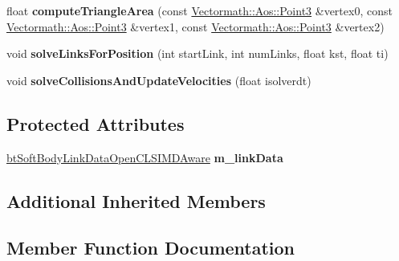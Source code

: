 \begin{DoxyCompactItemize}
float {\bfseries compute\+Triangle\+Area} (const \hyperlink{classVectormath_1_1Aos_1_1Point3}{Vectormath\+::\+Aos\+::\+Point3} \&vertex0, const \hyperlink{classVectormath_1_1Aos_1_1Point3}{Vectormath\+::\+Aos\+::\+Point3} \&vertex1, const \hyperlink{classVectormath_1_1Aos_1_1Point3}{Vectormath\+::\+Aos\+::\+Point3} \&vertex2)
\item 
\mbox{\label{classbtOpenCLSoftBodySolverSIMDAware_a08067324c12be8a65f8e04e222e2a0c3}} 
void {\bfseries solve\+Links\+For\+Position} (int start\+Link, int num\+Links, float kst, float ti)
\item 
\mbox{\label{classbtOpenCLSoftBodySolverSIMDAware_a8dbb149d1a9e3e836b63ab5682bf1a3c}} 
void {\bfseries solve\+Collisions\+And\+Update\+Velocities} (float isolverdt)
\end{DoxyCompactItemize}
\subsection*{Protected Attributes}
\begin{DoxyCompactItemize}
\item 
\mbox{\label{classbtOpenCLSoftBodySolverSIMDAware_af0314c7ba022a0651bbb79d2cfc5e3a7}} 
\hyperlink{classbtSoftBodyLinkDataOpenCLSIMDAware}{bt\+Soft\+Body\+Link\+Data\+Open\+C\+L\+S\+I\+M\+D\+Aware} {\bfseries m\+\_\+link\+Data}
\end{DoxyCompactItemize}
\subsection*{Additional Inherited Members}


\subsection{Member Function Documentation}
\mbox{\label{classbtOpenCLSoftBodySolverSIMDAware_a34d8e98c8756aeeac24554c18f06c0c1}} 
